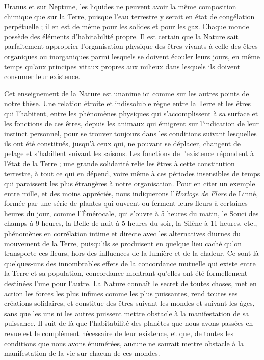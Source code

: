 \documentclass[a4paper, 11pt, oneside, landscape]{article}
\begin{document}
Uranus et sur Neptune, les liquides ne peuvent avoir la même composition chimique que sur la Terre, puisque l'eau terrestre y serait en état de congélation perpétuelle ; il en est de même pour les solides et pour les gaz. Chaque monde possède des éléments d'habitabilité propre. Il est certain que la Nature sait parfaitement approprier l'organisation physique des êtres vivants à celle des êtres organiques ou inorganiques parmi lesquels se doivent écouler leurs jours, en même temps qu'aux principes vitaux propres aux milieux dans lesquels ils doivent consumer leur existence.

Cet enseignement de la Nature est unanime ici comme sur les autres points de notre thèse. Une relation étroite et indissoluble règne entre la Terre et les êtres qui l'habitent, entre les phénomènes physiques qui s'accomplissent à sa surface et les fonctions de ces êtres, depuis les animaux qui émigrent sur l'indication de leur instinct personnel, pour se trouver toujours dans les conditions suivant lesquelles ils ont été constitués, jusqu'à ceux qui, ne pouvant se déplacer, changent de pelage et s'habillent suivant les saisons. Les fonctions de l'existence répondent à l'état de la Terre ; une grande solidarité relie les êtres à cette constitution terrestre, à tout ce qui en dépend, voire même à ces périodes insensibles de temps qui paraissent les plus étrangères à notre organisation. Pour en citer un exemple entre mille, et des moins appréciés, nous indiquerons l'\emph{Horloge de Flore} de Linné, formée par une série de plantes qui ouvrent ou ferment leurs fleurs à certaines heures du jour, comme l'Émérocale, qui s'ouvre à 5 heures du matin, le Souci des champs à 9 heures, la Belle-de-nuit à 5 heures du soir, la Silène à 11 heures, etc., phénomènes en corrélation intime et directe avec les alternatives diurnes du mouvement de la Terre, puisqu'ils se produisent en quelque lieu caché qu'on transporte ces fleurs, hors des influences de la lumière et de la chaleur. Ce sont là quelques-uns des innombrables effets de la concordance mutuelle qui existe entre la Terre et sa population, concordance montrant qu'elles ont été formellement destinées l'une pour l'autre. La Nature connaît le secret de toutes choses, met en action les forces les plus infimes comme les plus puissantes, rend toutes ses créations solidaires, et constitue des êtres suivant les mondes et suivant les âges, sans que les uns ni les autres puissent mettre obstacle à la manifestation de sa puissance. Il suit de là que l'habitabilité des planètes que nous avons passées en revue est le complément nécessaire de leur existence, et que, de toutes les conditions que nous avons énumérées, aucune ne saurait mettre obstacle à la manifestation de la vie sur chacun de ces mondes.
\end{document}
